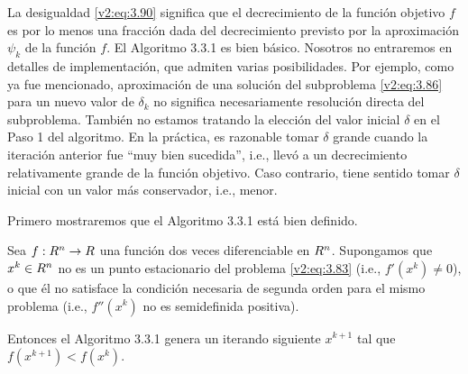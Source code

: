 La desigualdad \eqref{v2:eq:3.90} significa que el decrecimiento de la función objetivo $f$ es por lo menos una fracción dada del decrecimiento previsto por la aproximación $\psi_k$ de la función $f$.
El Algoritmo 3.3.1 es bien básico. Nosotros no entraremos en detalles de implementación, que admiten varias posibilidades. Por ejemplo, como ya fue mencionado, aproximación de una solución del subproblema \eqref{v2:eq:3.86} para un nuevo valor de $\delta_k$ no significa necesariamente resolución directa del subproblema. También no estamos tratando la elección del valor inicial $\delta$ en el Paso 1 del algoritmo. En la práctica, es razonable tomar $\delta$ grande cuando la iteración anterior fue ``muy bien sucedida'', i.e., llevó a un decrecimiento relativamente grande de la función objetivo. Caso contrario, tiene sentido tomar $\delta$ inicial con un valor más conservador, i.e., menor.

Primero mostraremos que el Algoritmo 3.3.1 está bien definido.

\begin{proposition}\label{v2:prop:3.3.1}
    Sea $f : R^n \to R$ una función dos veces diferenciable en $R^n$. Supongamos que $x^k \in R^n$ no es un punto estacionario del problema \eqref{v2:eq:3.83} (i.e., $f'(x^k) \neq 0$), o que él no satisface la condición necesaria de segunda orden para el mismo problema (i.e., $f''(x^k)$ no es semidefinida positiva).
    
    Entonces el Algoritmo 3.3.1 genera un iterando siguiente $x^{k+1}$ tal que $f(x^{k+1}) < f(x^k)$.
\end{proposition}

